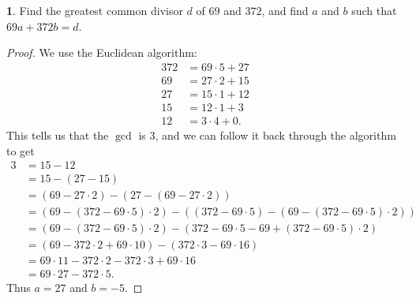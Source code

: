 \documentclass[12pt]{article}
\theoremstyle{definition}
\newtheorem{ex}{}
\begin{document}
\begin{ex}
	Find the greatest common divisor $d$ of $69$ and $372$, and find $a$ and $b$ such that $69a + 372b = d$.
\end{ex}
\begin{proof}
	We use the Euclidean algorithm: \begin{align*}
		372 & = 69 \cdot 5 + 27 \\
		69  & = 27 \cdot 2 + 15 \\
		27  & = 15 \cdot 1 + 12 \\
		15  & = 12 \cdot 1 + 3  \\
		12  & = 3 \cdot 4 + 0.
	\end{align*}
	This tells us that the $\gcd$ is 3, and we can follow it back through the algorithm to get \begin{align*}
		3 & = 15 - 12                                                                                      \\
		  & = 15 - (27 - 15)                                                                               \\
		  & = (69 - 27 \cdot 2) - (27 - (69 - 27 \cdot 2))                                                 \\
		  & = (69 - (372 - 69 \cdot 5) \cdot 2) - ((372 - 69 \cdot 5) - (69 - (372 - 69 \cdot 5) \cdot 2)) \\
		  & = (69 - (372 - 69 \cdot 5) \cdot 2) - (372 - 69 \cdot 5 - 69 + (372 - 69 \cdot 5) \cdot 2)     \\
		  & = (69 - 372 \cdot 2 + 69 \cdot 10) - (372 \cdot 3 - 69 \cdot 16)                               \\
		  & = 69 \cdot 11 - 372 \cdot 2 - 372 \cdot 3 + 69 \cdot 16                                        \\
		  & = 69 \cdot 27 - 372 \cdot 5.
	\end{align*}
	Thus $a = 27$ and $b = -5$.
\end{proof}
\end{document}
